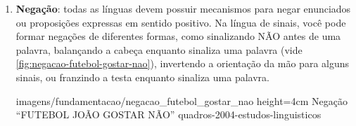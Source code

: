 \begin{enumerate}
\begin{enumerate}
    \end{enumerate}
    
    \item \textbf{Negação}: todas as línguas devem possuir mecanismos para negar enunciados ou proposições expressas em sentido positivo. Na língua de sinais, você pode formar negações de diferentes formas, como sinalizando NÃO antes de uma palavra, balançando a cabeça enquanto sinaliza uma palavra (vide \autoref{fig:negacao-futebol-gostar-nao}), invertendo a orientação da mão para alguns sinais, ou franzindo a testa enquanto sinaliza uma palavra.
    

    
        {imagens/fundamentacao/negacao_futebol_gostar_nao} %
        {height=4cm} %
        {Negação ``FUTEBOL JOÃO GOSTAR NÃO''} %
        {quadros-2004-estudos-linguisticos} %


\end{enumerate}








